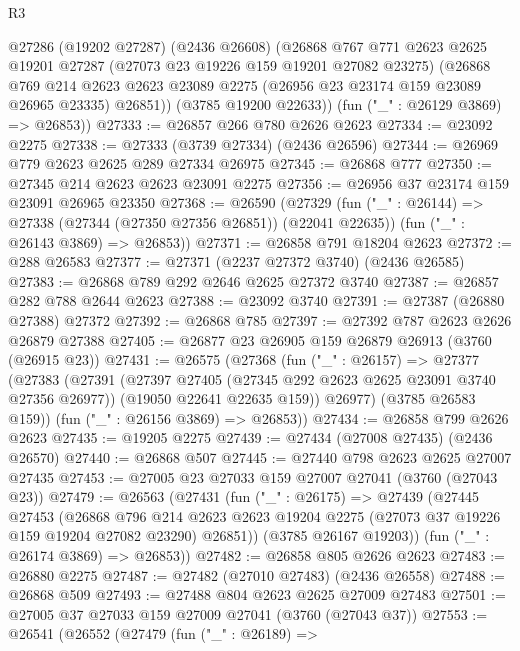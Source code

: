 \begin{lexlean}{R3}
\begin{coremodule}
      @27286
        (@19202 @27287)
        (@2436 @26608)
        (@26868
          @767
          @771
          @2623
          @2625
          @19201
          @27287
          (@27073 @23 @19226 @159 @19201 @27082 @23275)
          (@26868
            @769
            @214
            @2623
            @2623
            @23089
            @2275
            (@26956 @23 @23174 @159 @23089 @26965 @23335)
            @26851))
        (@3785 @19200 @22633))
      (fun ("_" : @26129 @3869) => @26853))
@27333 := @26857 @266 @780 @2626 @2623
@27334 := @23092 @2275
@27338 := @27333 (@3739 @27334) (@2436 @26596)
@27344 := @26969 @779 @2623 @2625 @289 @27334 @26975
@27345 := @26868 @777
@27350 := @27345 @214 @2623 @2623 @23091 @2275
@27356 := @26956 @37 @23174 @159 @23091 @26965 @23350
@27368 := @26590
    (@27329
      (fun ("_" : @26144) => @27338 (@27344 (@27350 @27356 @26851)) (@22041 @22635))
      (fun ("_" : @26143 @3869) => @26853))
@27371 := @26858 @791 @18204 @2623
@27372 := @288 @26583
@27377 := @27371 (@2237 @27372 @3740) (@2436 @26585)
@27383 := @26868 @789 @292 @2646 @2625 @27372 @3740
@27387 := @26857 @282 @788 @2644 @2623
@27388 := @23092 @3740
@27391 := @27387 (@26880 @27388) @27372
@27392 := @26868 @785
@27397 := @27392 @787 @2623 @2626 @26879 @27388
@27405 := @26877 @23 @26905 @159 @26879 @26913 (@3760 (@26915 @23))
@27431 := @26575
    (@27368
      (fun ("_" : @26157) =>
      @27377
        (@27383
          (@27391
            (@27397 @27405 (@27345 @292 @2623 @2625 @23091 @3740 @27356 @26977))
            (@19050 @22641 @22635 @159))
          @26977)
        (@3785 @26583 @159))
      (fun ("_" : @26156 @3869) => @26853))
@27434 := @26858 @799 @2626 @2623
@27435 := @19205 @2275
@27439 := @27434 (@27008 @27435) (@2436 @26570)
@27440 := @26868 @507
@27445 := @27440 @798 @2623 @2625 @27007 @27435
@27453 := @27005 @23 @27033 @159 @27007 @27041 (@3760 (@27043 @23))
@27479 := @26563
    (@27431
      (fun ("_" : @26175) =>
      @27439
        (@27445
          @27453
          (@26868
            @796
            @214
            @2623
            @2623
            @19204
            @2275
            (@27073 @37 @19226 @159 @19204 @27082 @23290)
            @26851))
        (@3785 @26167 @19203))
      (fun ("_" : @26174 @3869) => @26853))
@27482 := @26858 @805 @2626 @2623
@27483 := @26880 @2275
@27487 := @27482 (@27010 @27483) (@2436 @26558)
@27488 := @26868 @509
@27493 := @27488 @804 @2623 @2625 @27009 @27483
@27501 := @27005 @37 @27033 @159 @27009 @27041 (@3760 (@27043 @37))
@27553 := @26541
    (@26552
      (@27479
        (fun ("_" : @26189) =>

\end{coremodule}
\end{lexlean}
